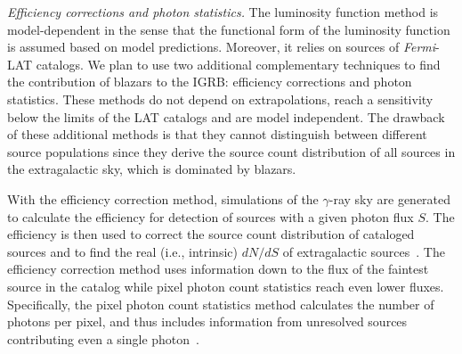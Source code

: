 \documentclass[12 pt]{article}
\begin{document}


{\it Efficiency corrections and photon statistics.}
The luminosity function method is model-dependent in the sense that the functional form of the luminosity function is assumed based on model predictions.
Moreover, it relies on sources of {\it Fermi}-LAT catalogs. We plan to use two additional complementary techniques to find the contribution of blazars to the IGRB: efficiency corrections and photon statistics.
These methods do not depend on extrapolations, reach a sensitivity below the limits of the LAT catalogs and are model independent.
The drawback of these additional methods is that they cannot distinguish between different source populations since they derive the source count distribution of all sources in the extragalactic sky, which is dominated by blazars.

With the efficiency correction method, simulations of the $\gamma$-ray sky are generated to calculate the efficiency for detection of sources with a given photon flux $S$. 
The efficiency is then used to correct the source count distribution of cataloged sources and to find the real (i.e., intrinsic) $dN/dS$ of extragalactic sources~\cite{TheFermi-LAT:2015ykq}.
The efficiency correction method uses information down to the flux of the faintest source in the catalog while pixel photon count statistics reach even lower fluxes.
Specifically, the pixel photon count statistics method calculates the number of photons per pixel, and thus includes information from unresolved sources contributing even a single photon~\cite{TheFermi-LAT:2015ykq}.
\end{document}
